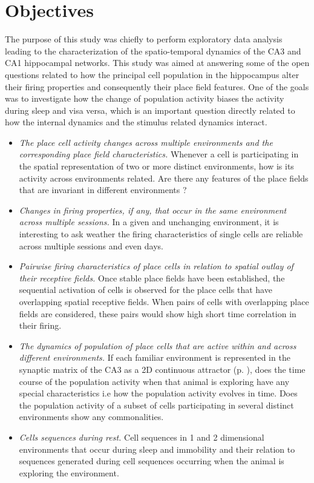 \section{Objectives}
The purpose of this study was chiefly to perform exploratory data analysis leading to the characterization of the spatio-temporal dynamics of the CA3 and CA1 hippocampal networks. This study was aimed at answering some of the  open questions related to how the principal cell population in the hippocampus alter their firing properties and consequently their place field features. One of the goals was to investigate how the change of population activity biases the activity during sleep and visa versa, which is an important question directly related to how the internal dynamics and the stimulus related dynamics interact. 
\begin{itemize}
\item \emph{The place cell activity changes across multiple environments and the corresponding place field characteristics.}
Whenever a cell is participating in the spatial representation of two or more distinct environments, how is its activity across environments related. Are there any features of the place fields that are invariant in different environments ?
\item \emph{Changes in firing properties, if any, that occur in the same environment across multiple sessions.}
In a given and unchanging environment, it is interesting to ask weather the firing characteristics of single cells are reliable across multiple sessions and even days.
\item \emph{Pairwise firing characteristics of place cells in relation to spatial outlay of their receptive fields.}
Once stable place fields have been established, the sequential activation of cells is observed for the place cells that have overlapping spatial receptive fields. When pairs of cells with overlapping place fields are considered, these pairs would show high short time correlation in their firing.
\item \emph{The dynamics of population of place cells that are active within and across different environments.}
If each familiar environment is represented in the synaptic matrix of the CA3 as a 2D continuous attractor (p. \pageref{fixedpt}), does the time course of the population activity when that animal is exploring have any special characteristics i.e how the population activity evolves in time. Does the population activity of a subset of cells participating in several distinct environments show any commonalities.
\item \emph{Cells sequences during rest.} 
Cell sequences in 1 and 2 dimensional environments that occur during sleep and immobility and their relation to sequences generated during cell sequences occurring when the animal is exploring the environment. 
\end{itemize}
 
